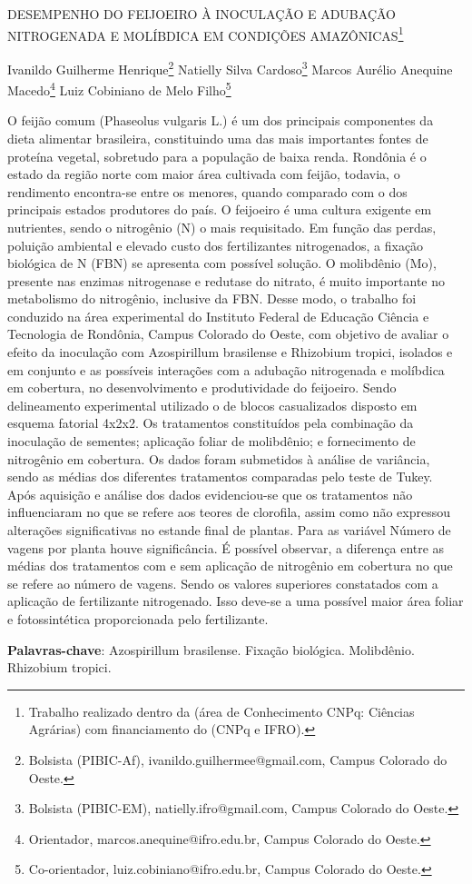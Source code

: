 \documentclass[article,12pt,onesidea,4paper,english,brazil]{abntex2}
\begin{document}
	
	
	\frenchspacing 
	
	\begin{center}
		\LARGE DESEMPENHO DO FEIJOEIRO À INOCULAÇÃO E ADUBAÇÃO NITROGENADA
		E MOLÍBDICA EM CONDIÇÕES AMAZÔNICAS\footnote{Trabalho realizado dentro da (área de Conhecimento CNPq: Ciências Agrárias) com financiamento do (CNPq e IFRO).}
		
		\normalsize
		Ivanildo Guilherme Henrique\footnote{Bolsista (PIBIC-Af), ivanildo.guilhermee@gmail.com, Campus Colorado do Oeste.} 
		Natielly Silva Cardoso\footnote{Bolsista (PIBIC-EM), natielly.ifro@gmail.com, Campus Colorado do Oeste.} 
		Marcos Aurélio Anequine Macedo\footnote{Orientador, marcos.anequine@ifro.edu.br, Campus Colorado do Oeste.} 
		Luiz Cobiniano de Melo Filho\footnote{Co-orientador, luiz.cobiniano@ifro.edu.br, Campus Colorado do Oeste.} 
	\end{center}
	
	\noindent O feijão comum (Phaseolus vulgaris L.) é um dos principais componentes da dieta
	alimentar brasileira, constituindo uma das mais importantes fontes de proteína
	vegetal, sobretudo para a população de baixa renda. Rondônia é o estado da região
	norte com maior área cultivada com feijão, todavia, o rendimento encontra-se entre
	os menores, quando comparado com o dos principais estados produtores do país. O
	feijoeiro é uma cultura exigente em nutrientes, sendo o nitrogênio (N) o mais
	requisitado. Em função das perdas, poluição ambiental e elevado custo dos
	fertilizantes nitrogenados, a fixação biológica de N (FBN) se apresenta com possível
	solução. O molibdênio (Mo), presente nas enzimas nitrogenase e redutase do
	nitrato, é muito importante no metabolismo do nitrogênio, inclusive da FBN. Desse
	modo, o trabalho foi conduzido na área experimental do Instituto Federal de
	Educação Ciência e Tecnologia de Rondônia, Campus Colorado do Oeste, com
	objetivo de avaliar o efeito da inoculação com Azospirillum brasilense e Rhizobium
	tropici, isolados e em conjunto e as possíveis interações com a adubação
	nitrogenada e molíbdica em cobertura, no desenvolvimento e produtividade do
	feijoeiro. Sendo delineamento experimental utilizado o de blocos casualizados
	disposto em esquema fatorial 4x2x2. Os tratamentos constituídos pela combinação
	da inoculação de sementes; aplicação foliar de molibdênio; e fornecimento de
	nitrogênio em cobertura. Os dados foram submetidos à análise de variância, sendo
	as médias dos diferentes tratamentos comparadas pelo teste de Tukey. Após
	aquisição e análise dos dados evidenciou-se que os tratamentos não influenciaram
	no que se refere aos teores de clorofila, assim como não expressou alterações
	significativas no estande final de plantas. Para as variável Número de vagens por
	planta houve significância. É possível observar, a diferença entre as médias dos
	tratamentos com e sem aplicação de nitrogênio em cobertura no que se refere ao
	número de vagens. Sendo os valores superiores constatados com a aplicação de
	fertilizante nitrogenado. Isso deve-se a uma possível maior área foliar e
	fotossintética proporcionada pelo fertilizante.
	
	\vspace{\onelineskip}
	
	\noindent
	\textbf{Palavras-chave}: Azospirillum brasilense. Fixação biológica. Molibdênio. Rhizobium
	tropici.
	
\end{document}
